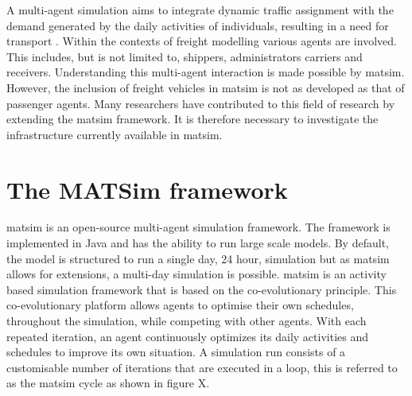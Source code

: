\label{chapter 3}
A multi-agent simulation aims to integrate dynamic traffic assignment with the demand generated by the daily activities of individuals, resulting in a need for transport \citep{erath2012large}. Within the contexts of freight modelling various agents are involved. This includes, but is not limited to, shippers, administrators carriers and receivers. Understanding this multi-agent interaction is made possible by \acrshort{matsim}. However, the inclusion of freight vehicles in \acrshort{matsim} is not as developed as that of passenger agents. Many researchers have contributed to this field of research by extending the \acrshort{matsim} framework. It is therefore necessary to investigate the infrastructure currently available in \acrshort{matsim}. 



\section{The MATSim framework}
\label{matsim_framework}
\acrshort{matsim} is an open-source multi-agent simulation framework. The framework is implemented in Java and has the ability to run large scale models. By default, the model is structured to run a single day, 24 hour, simulation but as \acrshort{matsim} allows for extensions, a multi-day simulation is possible. \acrshort{matsim} is an activity based simulation framework that is based on the co-evolutionary principle. This co-evolutionary platform allows agents to optimise their own schedules, throughout the simulation, while competing with other agents. With each repeated iteration, an agent continuously optimizes its daily activities and schedules to improve its own situation. A simulation run consists of a customisable number of iterations that are executed in a loop, this is referred to as the \acrshort{matsim} cycle as shown in figure X.

